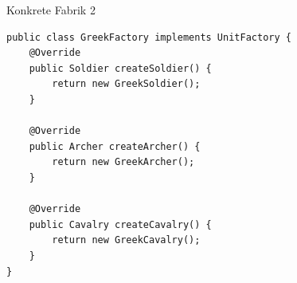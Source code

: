 \begin{frame}[fragile]{Konkrete Fabrik 2}
	\begin{exampleblock}{}
 		\begin{lstlisting}
public class GreekFactory implements UnitFactory {
    @Override
    public Soldier createSoldier() {
        return new GreekSoldier();
    }

    @Override
    public Archer createArcher() {
        return new GreekArcher();
    }

    @Override
    public Cavalry createCavalry() {
        return new GreekCavalry();
    }
}
        \end{lstlisting}
 	\end{exampleblock}
\end{frame}